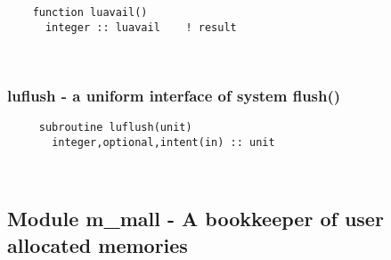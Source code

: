   
\begin{verbatim} 
 	function luavail()
 	  integer :: luavail	! result
 \end{verbatim}%
 
 
\mbox{}\hrulefill\ 

  \subsubsection{luflush - a uniform interface of system flush()}

  
\begin{verbatim} 
     subroutine luflush(unit)
       integer,optional,intent(in) :: unit
 \end{verbatim}%


 
 
\mbox{}\hrulefill\ 

  \subsection{Module m\_mall - A bookkeeper of user allocated memories }


